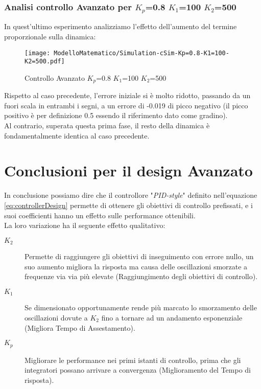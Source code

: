 \subsubsection{Analisi controllo Avanzato per $ K_p $=0.8 $ K_1 $=100 $ K_2 $=500}
In quest'ultimo esperimento analizziamo l'effetto dell'aumento del termine proporzionale sulla dinamica:
\begin{figure}[H]
	\centering
	\caption[Controllo Avanzato $ K_p $=0.8 $ K_1 $=100 $ K_2 $=500]{Controllo Avanzato $ K_p $=0.8 $ K_1 $=100 $ K_2 $=500}
	\texttt{[image: ModelloMatematico/Simulation-cSim-Kp=0.8-K1=100-K2=500.pdf]}
\end{figure}
\noindent
Rispetto al caso precedente, l'errore iniziale si è molto ridotto, passando da un fuori scala in entrambi i segni, a un errore di -0.019 di picco negativo (il picco positivo è per definizione 0.5 essendo il riferimento dato come gradino).\\
Al contrario, superata questa prima fase, il resto della dinamica è fondamentalmente identica al caso precedente.

\newpage

\section{Conclusioni per il design Avanzato}
In conclusione possiamo dire che il controllore "\textit{PID-style}" definito nell'equazione \ref{eq:controllerDesign} permette di ottenere gli obiettivi di controllo prefissati, e i suoi coefficienti hanno un effetto sulle performance ottenibili.\\
La loro variazione ha il seguente effetto qualitativo:
\begin{description}
	\item[{\boldmath$ K_2 $}] Permette di raggiungere gli obiettivi di inseguimento con errore nullo, un suo aumento migliora la risposta ma causa delle oscillazioni smorzate a frequenze via via più elevate (Raggiungimento degli obiettivi di controllo).
	\item[{\boldmath$ K_1 $}] Se dimensionato opportunamente rende più marcato lo smorzamento delle oscillazioni dovute a $ K_2 $ fino a tornare ad un andamento esponenziale (Migliora Tempo di Assestamento).
	\item[{\boldmath$ K_p $}] Migliorare le performance nei primi istanti di controllo, prima che gli integratori possano arrivare a convergenza (Miglioramento del Tempo di risposta).
\end{description}

